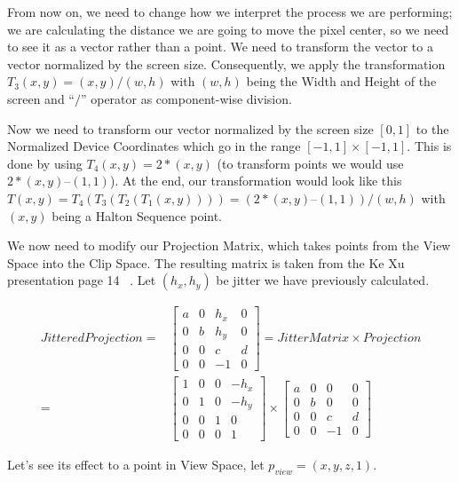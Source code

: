 \documentclass{cslthse-msc}
\begin{document}
\begin{appendices}
From now on, we need to change how we interpret the process we are performing; we are calculating the distance we are going to move the pixel center, so we need to see it as a vector rather than a point. We need to transform the vector to a vector normalized by the screen size. Consequently, we apply the transformation $T_3(x, y) = (x, y) / (w, h)$ with $(w, h)$ being the Width and Height of the screen and “$/$” operator as component-wise division.

Now we need to transform our vector normalized by the screen size $[0, 1]$ to the Normalized Device Coordinates which go in the range $[-1, 1]\times [-1, 1]$. This is done by using $T_4(x, y) = 2 * (x, y)$ (to transform points we would use $2*(x, y) – (1, 1)$).
At the end, our transformation would look like this $T(x, y) = T_4(T_3(T_2(T_1(x, y)))) = (2 * (x, y) – (1, 1)) / (w, h)$ with $(x, y)$ being a Halton Sequence point.

We now need to modify our Projection Matrix, which takes points from the View Space into the Clip Space. The resulting matrix is taken from the Ke Xu presentation page 14 ~\cite{XU2016}. Let $(h_x,h_y)$ be jitter we have previously calculated.

\begin{equation}
\begin{split}
JitteredProjection = & \begin{bmatrix*} 
a & 0 & h_x & 0 \\ 
0 & b & h_y & 0 \\
0 & 0 & c & d   \\
0 & 0 & -1 & 0   \end{bmatrix*} = JitterMatrix\times Projection \\
= & \begin{bmatrix*} 
1 & 0 & 0 & -h_x \\ 
0 & 1 & 0 & -h_y \\
0 & 0 & 1 & 0   \\
0 & 0 & 0 & 1   \end{bmatrix*} \times \begin{bmatrix*} 
a & 0 & 0 & 0 \\ 
0 & b & 0 & 0 \\
0 & 0 & c & d   \\
0 & 0 & -1 & 0   \end{bmatrix*}
\end{split}
\end{equation}

Let’s see its effect to a point in View Space, let $p_{view}=(x,y,z,1)$.


\end{appendices}
\end{document}
